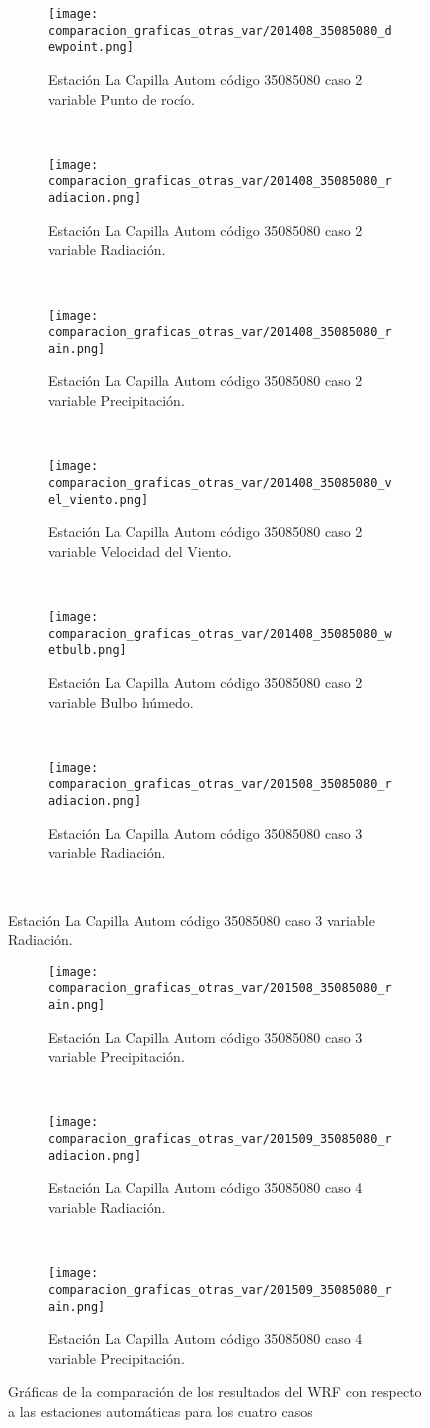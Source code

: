 \begin{figure}[H]
\centering
\begin{subfigure}[normla]{0.4\textwidth}
\caption{Estación La Capilla Autom código 35085080 caso 2 variable Punto de rocío.}
\texttt{[image: comparacion\_graficas\_otras\_var/201408\_35085080\_dewpoint.png]}
\end{subfigure}
~
\begin{subfigure}[normla]{0.4\textwidth}
\caption{Estación La Capilla Autom código 35085080 caso 2 variable Radiación.}
\texttt{[image: comparacion\_graficas\_otras\_var/201408\_35085080\_radiacion.png]}
\end{subfigure}
~
\begin{subfigure}[normla]{0.4\textwidth}
\caption{Estación La Capilla Autom código 35085080 caso 2 variable Precipitación.}
\texttt{[image: comparacion\_graficas\_otras\_var/201408\_35085080\_rain.png]}
\end{subfigure}
~
\begin{subfigure}[normla]{0.4\textwidth}
\caption{Estación La Capilla Autom código 35085080 caso 2 variable Velocidad del Viento.}
\texttt{[image: comparacion\_graficas\_otras\_var/201408\_35085080\_vel\_viento.png]}
\end{subfigure}
~
\begin{subfigure}[normla]{0.4\textwidth}
\caption{Estación La Capilla Autom código 35085080 caso 2 variable Bulbo húmedo.}
\texttt{[image: comparacion\_graficas\_otras\_var/201408\_35085080\_wetbulb.png]}
\end{subfigure}
~
\begin{subfigure}[normla]{0.4\textwidth}
\caption{Estación La Capilla Autom código 35085080 caso 3 variable Radiación.}
\texttt{[image: comparacion\_graficas\_otras\_var/201508\_35085080\_radiacion.png]}
\end{subfigure}
~
\end{figure}
           
\begin{figure}[H]
\centering
\begin{subfigure}[normla]{0.4\textwidth}
\caption{Estación La Capilla Autom código 35085080 caso 3 variable Precipitación.}
\texttt{[image: comparacion\_graficas\_otras\_var/201508\_35085080\_rain.png]}
\end{subfigure}
~
\begin{subfigure}[normla]{0.4\textwidth}
\caption{Estación La Capilla Autom código 35085080 caso 4 variable Radiación.}
\texttt{[image: comparacion\_graficas\_otras\_var/201509\_35085080\_radiacion.png]}
\end{subfigure}
~
\begin{subfigure}[normla]{0.4\textwidth}
\caption{Estación La Capilla Autom código 35085080 caso 4 variable Precipitación.}
\texttt{[image: comparacion\_graficas\_otras\_var/201509\_35085080\_rain.png]}
\end{subfigure}
    
    \caption{Gráficas de la comparación de los resultados del WRF con respecto a las estaciones automáticas para los cuatro casos}
    \label{fig:my_label}
\end{figure}
